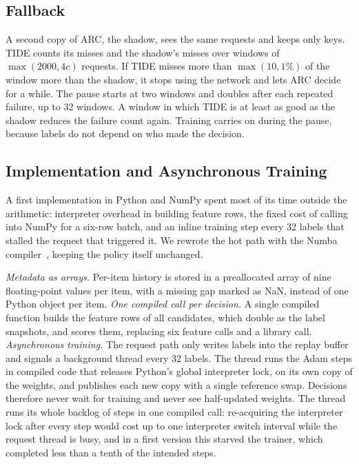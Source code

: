 \documentclass{llncs}
\begin{document}
\subsection{Fallback}

A second copy of ARC, the shadow, sees the same requests and keeps only keys. TIDE counts its misses and the shadow's misses over windows of $\max(2000, 4c)$ requests. If TIDE misses more than $\max(10, 1\%)$ of the window more than the shadow, it stops using the network and lets ARC decide for a while. The pause starts at two windows and doubles after each repeated failure, up to 32 windows. A window in which TIDE is at least as good as the shadow reduces the failure count again. Training carries on during the pause, because labels do not depend on who made the decision.

\subsection{Implementation and Asynchronous Training}
\label{sec:impl}

A first implementation in Python and NumPy spent most of its time outside the arithmetic: interpreter overhead in building feature rows, the fixed cost of calling into NumPy for a six-row batch, and an inline training step every 32 labels that stalled the request that triggered it. We rewrote the hot path with the Numba compiler~\cite{lam2015numba}, keeping the policy itself unchanged.

\emph{Metadata as arrays.} Per-item history is stored in a preallocated array of nine floating-point values per item, with a missing gap marked as NaN, instead of one Python object per item. \emph{One compiled call per decision.} A single compiled function builds the feature rows of all candidates, which double as the label snapshots, and scores them, replacing six feature calls and a library call. \emph{Asynchronous training.} The request path only writes labels into the replay buffer and signals a background thread every 32 labels. The thread runs the Adam steps in compiled code that releases Python's global interpreter lock, on its own copy of the weights, and publishes each new copy with a single reference swap. Decisions therefore never wait for training and never see half-updated weights. The thread runs its whole backlog of steps in one compiled call: re-acquiring the interpreter lock after every step would cost up to one interpreter switch interval while the request thread is busy, and in a first version this starved the trainer, which completed less than a tenth of the intended steps.
\end{document}
